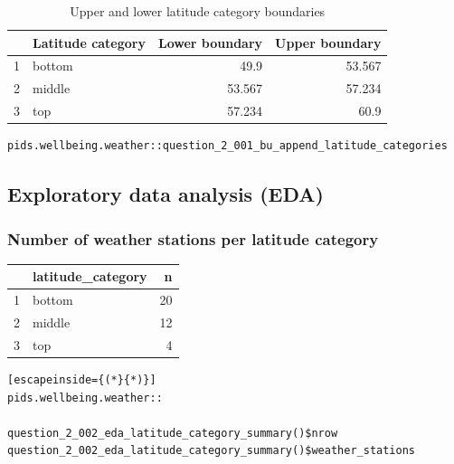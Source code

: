 \documentclass[12pt, oneside, openany]{book}
\begin{document}
\begin{table}[ht]
	\centering
	\begin{tabular}{rlr|r}
		\hline
		& Latitude category & Lower boundary & Upper boundary \\ 
		\hline
		1 & bottom &  49.9 & 53.567  \\ 
		2 & middle &  53.567 & 57.234 \\ 
		3 & top &  57.234 & 60.9 \\ 
		\hline
	\end{tabular}
	\caption{Upper and lower latitude category boundaries}
	\label{table:question_2_001_bu_append_latitude_categories}
\end{table}

	
\bigskip
\begin{lstlisting}[caption=Command to append latitude categories., label={lst:question_2_001_bu_append_latitude_categories}]
pids.wellbeing.weather::question_2_001_bu_append_latitude_categories
\end{lstlisting}

\subsection*{Exploratory data analysis (EDA)}

\subsubsection*{Number of weather stations per latitude category}

\begin{table}[ht]
\centering
\begin{tabular}{rlr}
  \hline
 & latitude\_category & n \\ 
  \hline
1 & bottom &  20 \\ 
  2 & middle &  12 \\ 
  3 & top &   4 \\ 
   \hline
\end{tabular}
\end{table}

\bigskip
\begin{lstlisting}[escapeinside={(*}{*)}]
pids.wellbeing.weather::

question_2_002_eda_latitude_category_summary()$nrow
question_2_002_eda_latitude_category_summary()$weather_stations
\end{lstlisting}
\end{document}
